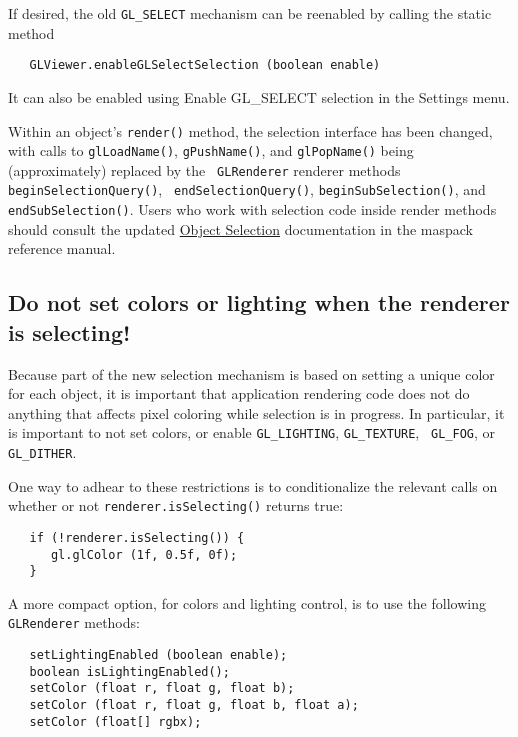 \documentclass{article}
\begin{document}
If desired, the old {\tt GL\_SELECT} mechanism can be reenabled by
calling the static method
\begin{verbatim}
   GLViewer.enableGLSelectSelection (boolean enable)
\end{verbatim}

It can also be enabled using {\sf Enable GL\_SELECT selection}
in the {\sf Settings} menu.

Within an object's {\tt render()} method, the selection interface has
been changed, with calls to {\tt glLoadName()}, {\tt gPushName()}, and
{\tt glPopName()} being (approximately) replaced by the {\tt
GLRenderer} renderer methods {\tt beginSelectionQuery()}, {\tt
endSelectionQuery()}, {\tt beginSubSelection()}, and {\tt
endSubSelection()}. Users who work with selection code inside render
methods should consult the updated 
\href{http://www.artisynth.org/doc/html/maspack/maspack.html#S3.SS3}%
{Object Selection}
documentation in the maspack
reference manual.

\subsection*{Do not set colors or lighting when the renderer is selecting!}

\begin{sideblock}
Because part of the new selection mechanism is based on setting a
unique color for each object, it is important that application
rendering code does not do anything that affects pixel coloring while
selection is in progress. In particular, it is important to not set
colors, or enable {\tt GL\_LIGHTING}, {\tt GL\_TEXTURE}, {\tt
GL\_FOG}, or {\tt GL\_DITHER}.
\end{sideblock}

One way to adhear to these restrictions is to conditionalize the
relevant calls on whether or not {\tt renderer.isSelecting()} returns
true:
\begin{lstlisting}
   if (!renderer.isSelecting()) {
      gl.glColor (1f, 0.5f, 0f);
   }
\end{lstlisting}
A more compact option, for colors and lighting control, is to use the
following {\tt GLRenderer} methods:
\begin{lstlisting}
   setLightingEnabled (boolean enable);
   boolean isLightingEnabled();
   setColor (float r, float g, float b);
   setColor (float r, float g, float b, float a);
   setColor (float[] rgbx);
\end{lstlisting}
\end{document}
